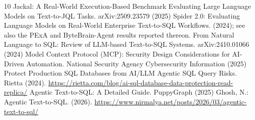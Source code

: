 \documentclass[runningheads]{llncs}
\begin{document}
\begin{thebibliography}{10}
 Jackal: A Real-World Execution-Based Benchmark Evaluating Large Language Models on Text-to-JQL Tasks. arXiv:2509.23579 (2025)
 Spider 2.0: Evaluating Language Models on Real-World Enterprise Text-to-SQL Workflows. (2024); see also the PExA and ByteBrain-Agent results reported thereon.
 From Natural Language to SQL: Review of LLM-based Text-to-SQL Systems. arXiv:2410.01066 (2024)
 Model Context Protocol (MCP): Security Design Considerations for AI-Driven Automation. National Security Agency Cybersecurity Information (2025)
 Protect Production SQL Databases from AI/LLM Agentic SQL Query Risks. Rietta (2024). \url{https://rietta.com/blog/ai-sql-database-data-protection-read-replica/}
 Agentic Text-to-SQL: A Detailed Guide. PuppyGraph (2025)
 Ghosh, N.: Agentic Text-to-SQL. (2026). \url{https://www.nirmalya.net/posts/2026/03/agentic-text-to-sql/}


\end{thebibliography}
\end{document}

